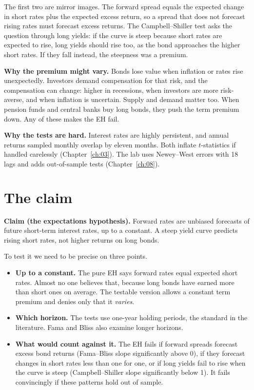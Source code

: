 The first two are mirror images. The forward spread equals the expected change in short rates plus the expected excess return, so a spread that does not forecast rising rates must forecast excess returns. The Campbell--Shiller test asks the question through long yields: if the curve is steep because short rates are expected to rise, long yields should rise too, as the bond approaches the higher short rates. If they fall instead, the steepness was a premium.

\textbf{Why the premium might vary.} Bonds lose value when inflation or rates rise unexpectedly. Investors demand compensation for that risk, and the compensation can change: higher in recessions, when investors are more risk-averse, and when inflation is uncertain. Supply and demand matter too. When pension funds and central banks buy long bonds, they push the term premium down. Any of these makes the EH fail.

\textbf{Why the tests are hard.} Interest rates are highly persistent, and annual returns sampled monthly overlap by eleven months. Both inflate $t$-statistics if handled carelessly (Chapter~\ref{ch:03}). The lab uses Newey--West errors with 18 lags and adds out-of-sample tests (Chapter~\ref{ch:08}).

\section{The claim}
\label{sec:10-claim}

\begin{callout}
\textbf{Claim (the expectations hypothesis).} Forward rates are unbiased forecasts of future short-term interest rates, up to a constant. A steep yield curve predicts rising short rates, not higher returns on long bonds.
\end{callout}

To test it we need to be precise on three points.

\begin{itemize}
  \item \textbf{Up to a constant.} The pure EH says forward rates equal expected short rates. Almost no one believes that, because long bonds have earned more than short ones on average. The testable version allows a constant term premium and denies only that it \emph{varies}.
  \item \textbf{Which horizon.} The tests use one-year holding periods, the standard in the literature. Fama and Bliss also examine longer horizons.
  \item \textbf{What would count against it.} The EH fails if forward spreads forecast excess bond returns (Fama--Bliss slope significantly above 0), if they forecast changes in short rates less than one for one, or if long yields fail to rise when the curve is steep (Campbell--Shiller slope significantly below 1). It fails convincingly if these patterns hold out of sample.
\end{itemize}

